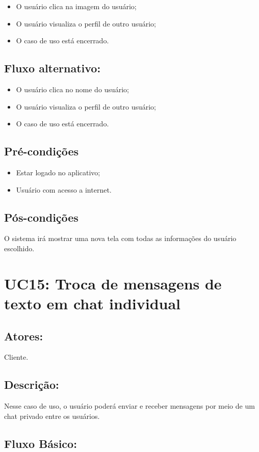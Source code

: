\begin{itemize}
    \item O usuário clica na imagem do usuário;
    \item O usuário visualiza o perfil de outro usuário;
    \item O caso de uso está encerrado.
\end{itemize}
\subsection{Fluxo alternativo:}
\begin{itemize}
    \item O usuário clica no nome do usuário;
    \item O usuário visualiza o perfil de outro usuário;
    \item O caso de uso está encerrado.
\end{itemize}
\subsection{Pré-condições}
\begin{itemize}
    \item Estar logado no aplicativo;
    \item Usuário com acesso a internet. 
\end{itemize}
\subsection{Pós-condições}
 O sistema irá mostrar uma nova tela com todas as informações do usuário escolhido. 
\section{UC15: Troca de mensagens de texto em chat individual}

\subsection{Atores:}
Cliente. 
\subsection{Descrição:}
Nesse caso de uso, o usuário poderá enviar e receber mensagens por meio de um chat privado entre os usuários. 
\subsection{Fluxo Básico:}

